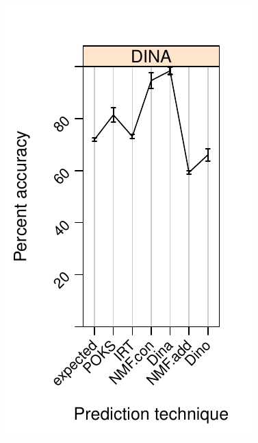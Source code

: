 \documentclass{beamer}
\begin{document}
\begin{frame}
\begin{overprint}
		\begin{columns}
		\begin{column}{0.5\textwidth}
		 \vspace{1.5cm}   
   \includegraphics[trim=0cm 0cm 0cm 1.5cm,clip=true,scale =0.55] {images/Predictive-Preformace_Sig.pdf}

\end{column}
\end{columns}
\end{overprint}
\end{frame}
\end{document}
